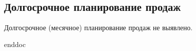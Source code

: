 \newpage
\subsection{Долгосрочное планирование продаж}
\label{bp:monthplan}

Долгосрочное (месячное) планирование продаж не выявлено. 


 {enddoc}